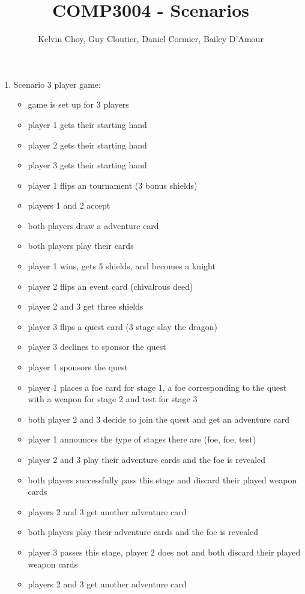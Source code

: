 \documentclass[11pt]{article}
\title{COMP3004 - Scenarios}
\author{Kelvin Choy, Guy Cloutier, Daniel Cormier, Bailey D'Amour}
\date{}
\begin{document}
\maketitle

\begin{enumerate}
\item Scenario 3 player game:
	\begin{itemize}
	\item game is set up for 3 players
	\item player 1 gets their starting hand
	\item player 2 gets their starting hand
	\item player 3 gets their starting hand
	\item player 1 flips an tournament (3 bonus shields)
	\item players 1 and 2 accept
	\item both players draw a adventure card
	\item both players play their cards
	\item player 1 wins, gets 5 shields, and becomes a knight
	\item player 2 flips an event card (chivalrous deed)
	\item player 2 and 3 get three shields
	\item player 3 flips a quest card (3 stage slay the dragon)
	\item player 3 declines to sponsor the quest
	\item player 1 sponsors the quest
	\item player 1 places a foe card for stage 1, a foe corresponding to the quest with a weapon for stage 2 and test for stage 3
	\item both player 2 and 3 decide to join the quest and get an adventure card
	\item player 1 announces the type of stages there are (foe, foe, test)
	\item player 2 and 3 play their adventure cards and the foe is revealed
	\item both players successfully pass this stage and discard their played weapon cards
	\item players 2 and 3 get another adventure card
	\item both players play their adventure cards and the foe is revealed
	\item player 3 passes this stage, player 2 does not and both discard their played weapon cards
	\item players 2 and 3 get another adventure card

\end{itemize}
\end{enumerate}
\end{document}
